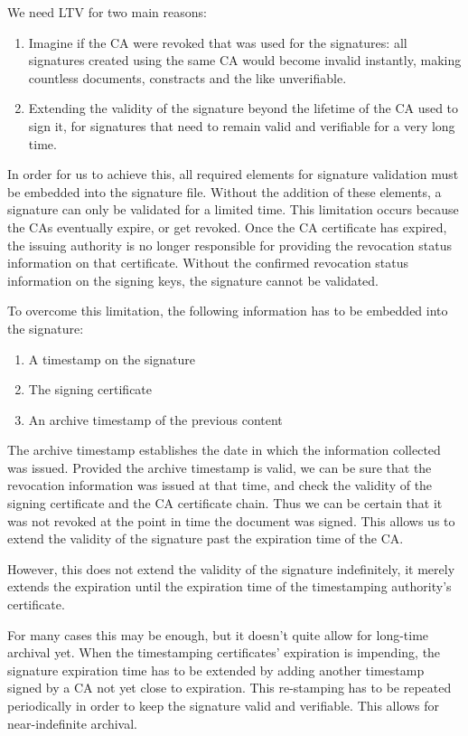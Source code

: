 We need \gls{LTV} for two main reasons:
\begin{enumerate}
    \item Imagine if the \gls{CA} were revoked that was used for the signatures: all signatures created using the same \gls{CA} would become invalid instantly, making countless documents, constracts and the like unverifiable.
    \item Extending the validity of the signature beyond the lifetime of the \gls{CA} used to sign it, for signatures that need to remain valid and verifiable for a very long time.
\end{enumerate}
In order for us to achieve this, all required elements for signature validation must be embedded into the signature file.
Without the addition of these elements, a signature can only be validated for a limited time.
This limitation occurs because the \gls{CA}s eventually expire, or get revoked.
Once the \gls{CA} certificate has expired, the issuing authority is no longer responsible for providing the revocation status information on that certificate.
Without the confirmed revocation status information on the signing keys, the signature cannot be validated.

To overcome this limitation, the following information has to be embedded into the signature:
\begin{enumerate}
    \item A timestamp on the signature
    \item The signing certificate
    \item An archive timestamp of the previous content
\end{enumerate}

The archive timestamp establishes the date in which the information collected was issued.
Provided the archive timestamp is valid,
we can be sure that the revocation information was issued at that time,
and check the validity of the signing certificate and the \gls{CA} certificate chain.
Thus we can be certain that it was not revoked at the point in time the document was signed.
This allows us to extend the validity of the signature past the expiration time of the \gls{CA}.

However, this does not extend the validity of the signature indefinitely,
it merely extends the expiration until the expiration time of the timestamping authority's certificate.

For many cases this may be enough, but it doesn't quite allow for long-time archival yet.
When the timestamping certificates' expiration is impending,
the signature expiration time has to be extended by adding another timestamp signed by a \gls{CA} not yet close to expiration.
This re-stamping has to be repeated periodically in order to keep the signature valid and verifiable.
This allows for near-indefinite archival.

